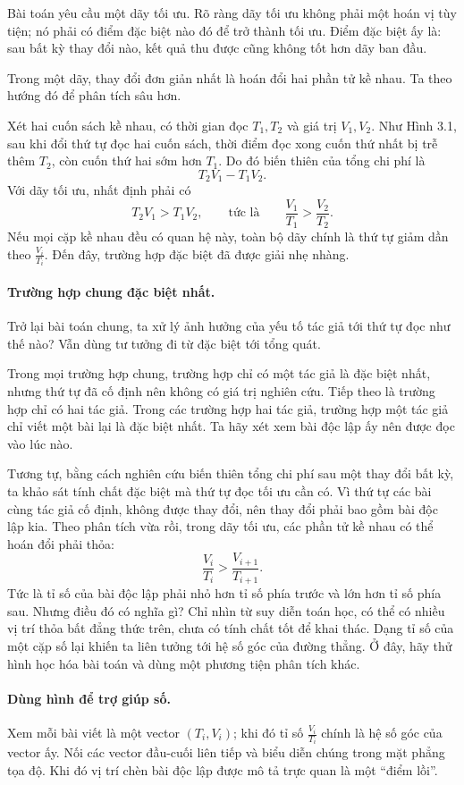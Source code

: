 \documentclass[11pt]{article}
\begin{document}
Bài toán yêu cầu một dãy tối ưu. Rõ ràng dãy tối ưu không phải một hoán vị tùy
tiện; nó phải có điểm đặc biệt nào đó để trở thành tối ưu. Điểm đặc biệt ấy là:
sau bất kỳ thay đổi nào, kết quả thu được cũng không tốt hơn dãy ban đầu.

Trong một dãy, thay đổi đơn giản nhất là hoán đổi hai phần tử kề nhau. Ta theo
hướng đó để phân tích sâu hơn.

Xét hai cuốn sách kề nhau, có thời gian đọc \(T_1,T_2\) và giá trị
\(V_1,V_2\). Như Hình 3.1, sau khi đổi thứ tự đọc hai cuốn sách, thời điểm đọc
xong cuốn thứ nhất bị trễ thêm \(T_2\), còn cuốn thứ hai sớm hơn \(T_1\). Do
đó biến thiên của tổng chi phí là
\[
  T_2V_1-T_1V_2.
\]
Với dãy tối ưu, nhất định phải có
\[
  T_2V_1>T_1V_2,
  \qquad\text{tức là}\qquad
  \frac{V_1}{T_1}>\frac{V_2}{T_2}.
\]
Nếu mọi cặp kề nhau đều có quan hệ này, toàn bộ dãy chính là thứ tự giảm dần
theo \(\frac{V_i}{T_i}\). Đến đây, trường hợp đặc biệt đã được giải nhẹ nhàng.

\paragraph{Trường hợp chung đặc biệt nhất.}
Trở lại bài toán chung, ta xử lý ảnh hưởng của yếu tố tác giả tới thứ tự đọc
như thế nào? Vẫn dùng tư tưởng đi từ đặc biệt tới tổng quát.

Trong mọi trường hợp chung, trường hợp chỉ có một tác giả là đặc biệt nhất,
nhưng thứ tự đã cố định nên không có giá trị nghiên cứu. Tiếp theo là trường
hợp chỉ có hai tác giả. Trong các trường hợp hai tác giả, trường hợp một tác
giả chỉ viết một bài lại là đặc biệt nhất. Ta hãy xét xem bài độc lập ấy nên
được đọc vào lúc nào.

Tương tự, bằng cách nghiên cứu biến thiên tổng chi phí sau một thay đổi bất kỳ,
ta khảo sát tính chất đặc biệt mà thứ tự đọc tối ưu cần có. Vì thứ tự các bài
cùng tác giả cố định, không được thay đổi, nên thay đổi phải bao gồm bài độc
lập kia. Theo phân tích vừa rồi, trong dãy tối ưu, các phần tử kề nhau có thể
hoán đổi phải thỏa:
\[
  \frac{V_i}{T_i}>\frac{V_{i+1}}{T_{i+1}}.
\]
Tức là tỉ số của bài độc lập phải nhỏ hơn tỉ số phía trước và lớn hơn tỉ số
phía sau. Nhưng điều đó có nghĩa gì? Chỉ nhìn từ suy diễn toán học, có thể có
nhiều vị trí thỏa bất đẳng thức trên, chưa có tính chất tốt để khai thác.
Dạng tỉ số của một cặp số lại khiến ta liên tưởng tới hệ số góc của đường
thẳng. Ở đây, hãy thử hình học hóa bài toán và dùng một phương tiện phân tích
khác.

\paragraph{Dùng hình để trợ giúp số.}
Xem mỗi bài viết là một vector \((T_i,V_i)\); khi đó tỉ số
\(\frac{V_i}{T_i}\) chính là hệ số góc của vector ấy. Nối các vector đầu-cuối
liên tiếp và biểu diễn chúng trong mặt phẳng tọa độ. Khi đó vị trí chèn bài
độc lập được mô tả trực quan là một ``điểm lồi''.
\end{document}
